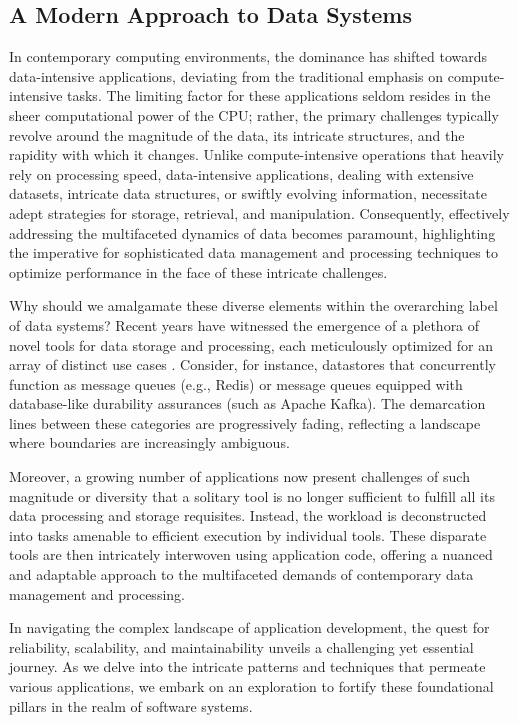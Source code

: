 \subsection{A Modern Approach to Data Systems}
In contemporary computing environments, the dominance has shifted towards
data-intensive applications, deviating from the traditional emphasis on
compute-intensive tasks. The limiting factor for these applications seldom
resides in the sheer computational power of the CPU; rather, the primary
challenges typically revolve around the magnitude of the data, its intricate
structures, and the rapidity with which it changes. Unlike compute-intensive
operations that heavily rely on processing speed, data-intensive applications,
dealing with extensive datasets, intricate data structures, or swiftly evolving
information, necessitate adept strategies for storage, retrieval, and
manipulation. Consequently, effectively addressing the multifaceted dynamics of
data becomes paramount, highlighting the imperative for sophisticated data
management and processing techniques to optimize performance in the face of
these intricate challenges.

Why should we amalgamate these diverse elements within the overarching label of
data systems? Recent years have witnessed the emergence of a plethora of novel
tools for data storage and processing, each meticulously optimized for an array
of distinct use cases \cite{stonebraker2005onesize}. Consider, for instance,
datastores that concurrently function as message queues (e.g., Redis) or message
queues equipped with database-like durability assurances (such as Apache Kafka).
The demarcation lines between these categories are progressively fading,
reflecting a landscape where boundaries are increasingly ambiguous.

Moreover, a growing number of applications now present challenges of such
magnitude or diversity that a solitary tool is no longer sufficient to fulfill
all its data processing and storage requisites. Instead, the workload is
deconstructed into tasks amenable to efficient execution by individual tools.
These disparate tools are then intricately interwoven using application code,
offering a nuanced and adaptable approach to the multifaceted demands of
contemporary data management and processing.

In navigating the complex landscape of application development, the quest for
reliability, scalability, and maintainability unveils a challenging yet
essential journey. As we delve into the intricate patterns and techniques that
permeate various applications, we embark on an exploration to fortify these
foundational pillars in the realm of software systems.

